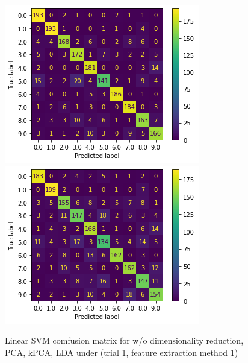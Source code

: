 \documentclass{article}
\begin{document}
\begin{figure}[!htb]
  \includegraphics[width=\linewidth]{figure/svm_kpca_cm.png}
\endminipage\hfill
{}
  \includegraphics[width=\linewidth]{figure/svm_lda_cm.png}
\endminipage
\caption{Linear SVM comfusion matrix for w/o dimensionality reduction, PCA, kPCA, LDA under (trial 1, feature extraction method 1)}
\label{lsvm_cm}
\end{figure}
\end{document}
